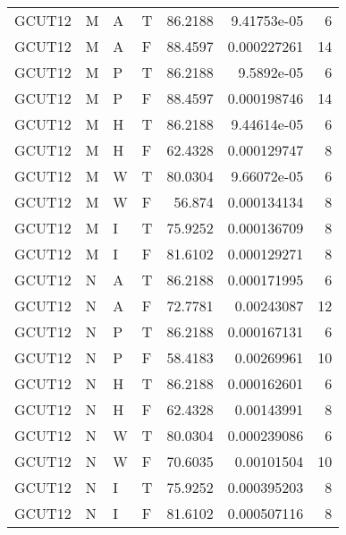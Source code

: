 \begin{tabular}{llllrrr}
    GCUT12   & M     & A     & T          & 86.2188    & 9.41753e-05 & 6        \\
    GCUT12   & M     & A     & F          & 88.4597    & 0.000227261 & 14       \\
    GCUT12   & M     & P     & T          & 86.2188    & 9.5892e-05  & 6        \\
    GCUT12   & M     & P     & F          & 88.4597    & 0.000198746 & 14       \\
    GCUT12   & M     & H     & T          & 86.2188    & 9.44614e-05 & 6        \\
    GCUT12   & M     & H     & F          & 62.4328    & 0.000129747 & 8        \\
    GCUT12   & M     & W     & T          & 80.0304    & 9.66072e-05 & 6        \\
    GCUT12   & M     & W     & F          & 56.874     & 0.000134134 & 8        \\
    GCUT12   & M     & I     & T          & 75.9252    & 0.000136709 & 8        \\
    GCUT12   & M     & I     & F          & 81.6102    & 0.000129271 & 8        \\
    GCUT12   & N     & A     & T          & 86.2188    & 0.000171995 & 6        \\
    GCUT12   & N     & A     & F          & 72.7781    & 0.00243087  & 12       \\
    GCUT12   & N     & P     & T          & 86.2188    & 0.000167131 & 6        \\
    GCUT12   & N     & P     & F          & 58.4183    & 0.00269961  & 10       \\
    GCUT12   & N     & H     & T          & 86.2188    & 0.000162601 & 6        \\
    GCUT12   & N     & H     & F          & 62.4328    & 0.00143991  & 8        \\
    GCUT12   & N     & W     & T          & 80.0304    & 0.000239086 & 6        \\
    GCUT12   & N     & W     & F          & 70.6035    & 0.00101504  & 10       \\
    GCUT12   & N     & I     & T          & 75.9252    & 0.000395203 & 8        \\
    GCUT12   & N     & I     & F          & 81.6102    & 0.000507116 & 8        \\
    \hline
\end{tabular}